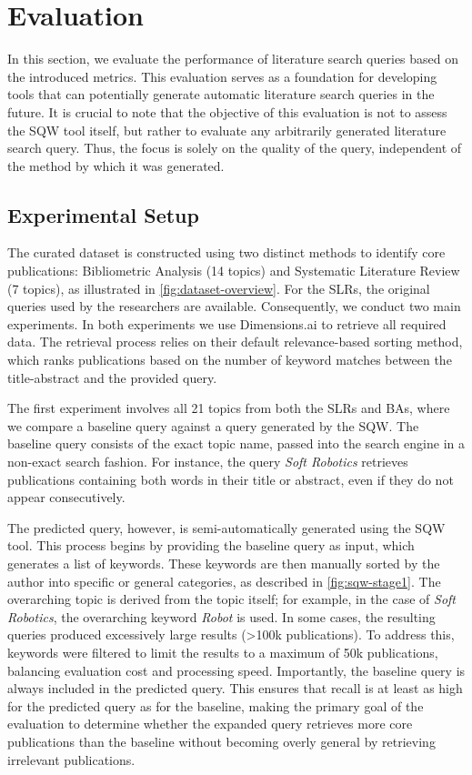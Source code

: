 \chapter{Evaluation}\label{ch:eval}
In this section, we evaluate the performance of literature search queries based on the introduced metrics. This evaluation serves as a foundation for developing tools that can potentially generate automatic literature search queries in the future. It is crucial to note that the objective of this evaluation is not to assess the SQW tool itself, but rather to evaluate any arbitrarily generated literature search query. Thus, the focus is solely on the quality of the query, independent of the method by which it was generated.

\section{Experimental Setup}

The curated dataset is constructed using two distinct methods to identify core publications: Bibliometric Analysis (14 topics) and Systematic Literature Review (7 topics), as illustrated in \autoref{fig:dataset-overview}. For the SLRs, the original queries used by the researchers are available. Consequently, we conduct two main experiments. In both experiments we use Dimensions.ai to retrieve all required data. The retrieval process relies on their default relevance-based sorting method, which ranks publications based on the number of keyword matches between the title-abstract and the provided query.

The first experiment involves all 21 topics from both the SLRs and BAs, where we compare a baseline query against a query generated by the SQW. The baseline query consists of the exact topic name, passed into the search engine in a non-exact search fashion. For instance, the query \textit{Soft Robotics} retrieves publications containing both words in their title or abstract, even if they do not appear consecutively.

The predicted query, however, is semi-automatically generated using the SQW tool. This process begins by providing the baseline query as input, which generates a list of keywords. These keywords are then manually sorted by the author into specific or general categories, as described in \autoref{fig:sqw-stage1}. The overarching topic is derived from the topic itself; for example, in the case of \textit{Soft Robotics}, the overarching keyword \textit{Robot} is used. In some cases, the resulting queries produced excessively large results (>100k publications). To address this, keywords were filtered to limit the results to a maximum of 50k publications, balancing evaluation cost and processing speed. Importantly, the baseline query is always included in the predicted query. This ensures that recall is at least as high for the predicted query as for the baseline, making the primary goal of the evaluation to determine whether the expanded query retrieves more core publications than the baseline without becoming overly general by retrieving irrelevant publications.

